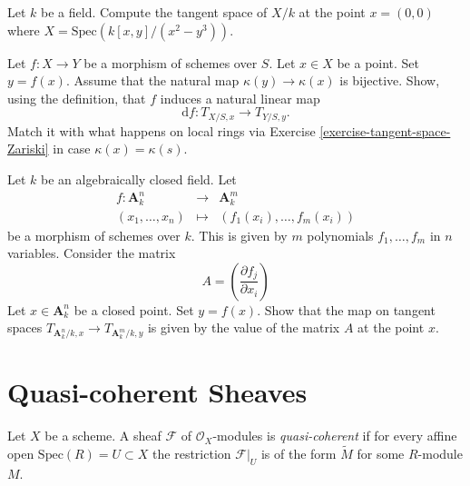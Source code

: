 \begin{exercise}
\label{exercise-compute-TS-cusp}
Let $k$ be a field.
Compute the tangent space of $X/k$ at the point $x = (0, 0)$
where $X = \text{Spec}(k[x, y]/(x^2 - y^3))$.
\end{exercise}

\begin{exercise}
\label{exercise-map-tangent-spaces}
Let $f : X \to Y$ be a morphism of schemes over $S$.
Let $x \in X$ be a point. Set $y = f(x)$.
Assume that the natural map $\kappa(y) \to \kappa(x)$ is
bijective. Show, using the definition,
that $f$ induces a natural linear map
$$
\text{d}f : T_{X/S, x} \longrightarrow T_{Y/S, y}.
$$
Match it with what happens on local rings via
Exercise \ref{exercise-tangent-space-Zariski} in case $\kappa(x) = \kappa(s)$.
\end{exercise}

\begin{exercise}
\label{exercise-Jacobian}
Let $k$ be an algebraically closed field.
Let
\begin{eqnarray*}
f : \mathbf{A}_k^n & \longrightarrow & \mathbf{A}^m_k \\
(x_1, \ldots, x_n) & \longmapsto & (f_1(x_i), \ldots, f_m(x_i))
\end{eqnarray*}
be a morphism of schemes over $k$. This is given by
$m$ polynomials $f_1, \ldots, f_m$ in $n$ variables.
Consider the matrix
$$
A = \left( \frac{\partial f_j}{\partial x_i} \right)
$$
Let $x \in \mathbf{A}^n_k$ be a closed point.
Set $y =  f(x)$. Show that the map on tangent spaces
$T_{\mathbf{A}^n_k/k, x} \to T_{\mathbf{A}^m_k/k, y}$
is given by the value of the matrix $A$ at the point $x$.
\end{exercise}














\section{Quasi-coherent Sheaves}
\label{section-quasi-coherent}

\begin{definition}
\label{definition-quasi-coherent}
Let $X$ be a scheme.
A sheaf $\mathcal{F}$ of $\mathcal{O}_X$-modules is {\it quasi-coherent}
if for every affine open $\text{Spec}(R) = U \subset X$ the restriction
$\mathcal{F}|_U$ is of the form $\widetilde M$ for some $R$-module
$M$.
\end{definition}

